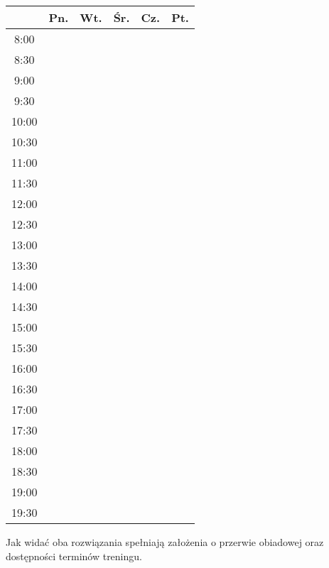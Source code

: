 \documentclass{article}
\begin{document}
\begin{table}[H]
	\centering
	\begin{tabular}{c|c|c|c|c|c}
		& Pn. & Wt. & Śr. & Cz. & Pt.\\\hline
		8:00 & & & & \cellcolor{blue!50} & \\\hline
		8:30 & & & & \cellcolor{blue!50} & \\\hline
		9:00 & & & & \cellcolor{blue!50} & \\\hline
		9:30 & & & & \cellcolor{blue!50} & \\\hline
		10:00 & & \cellcolor{blue!50} & & & \\\hline
		10:30 & \cellcolor{blue!50} & \cellcolor{blue!50} & & & \\\hline
		11:00 & \cellcolor{blue!50} & \cellcolor{blue!50} & & & \\\hline
		11:30 & \cellcolor{blue!50} & \cellcolor{blue!50} & & & \\\hline
		12:00 & & \cellcolor{blue!50} & & & \\\hline
		12:30 & & \cellcolor{blue!50} & & & \\\hline
		13:00 & \cellcolor{blue!50} & & & \cellcolor{blue!50} & \\\hline
		13:30 & \cellcolor{blue!50} & & & \cellcolor{blue!50} & \\\hline
		14:00 & \cellcolor{blue!50} & & & \cellcolor{blue!50} & \\\hline
		14:30 & \cellcolor{blue!50} & & & \cellcolor{blue!50} & \\\hline
		15:00 & & & & & \\\hline
		15:30 & & & & & \\\hline
		16:00 & & & & & \\\hline
		16:30 & & & & & \\\hline
		17:00 & & & & & \\\hline
		17:30 & & & & & \\\hline
		18:00 & & & & & \\\hline
		18:30 & & & & & \\\hline
		19:00 & & & & & \\\hline
		19:30 & & & & & \\\hline
	\end{tabular}
\end{table}

Jak widać oba rozwiązania spełniają założenia o przerwie obiadowej oraz dostępności terminów treningu.
\end{document}
